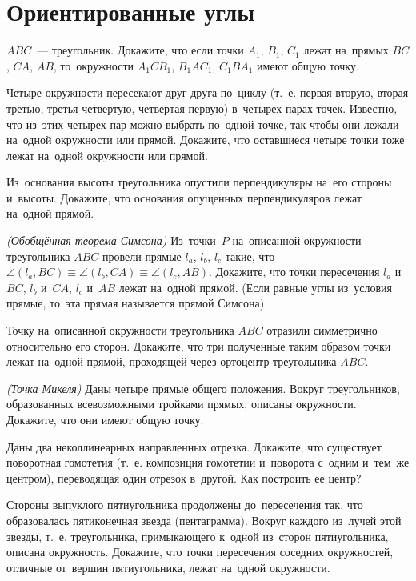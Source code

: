 
\section*{Ориентированные углы}


\begin{problems}

\item
$ABC$~--- треугольник.
Докажите, что если точки $A_1$, $B_1$, $C_1$ лежат на~прямых $BC$, $CA$, $AB$,
то~окружности $A_1 C B_1$, $B_1 A C_1$, $C_1 B A_1$ имеют общую точку.

\item
Четыре окружности пересекают друг друга по~циклу (т.~е. первая вторую, вторая
третью, третья четвертую, четвертая первую) в~четырех парах точек.
Известно, что из~этих четырех пар можно выбрать по~одной точке, так чтобы они
лежали на~одной окружности или прямой.
Докажите, что оставшиеся четыре точки тоже лежат на~одной окружности или
прямой.

\item
Из~основания высоты треугольника опустили перпендикуляры на~его стороны
и~высоты.
Докажите, что основания опущенных перпендикуляров лежат на~одной прямой.

\item\emph{(Обобщённая теорема Симсона)}
Из~точки~$P$ на~описанной окружности треугольника $ABC$ провели
прямые $l_a$, $l_b$, $l_c$ такие, что
$\angle (l_a, BC) \equiv \angle (l_b, CA) \equiv \angle (l_c, AB)$.
Докажите, что точки пересечения $l_a$ и~$BC$, $l_b$ и~$CA$, $l_c$ и~$AB$ лежат
на~одной прямой.
(Если равные углы из~условия прямые, то~эта прямая называется прямой Симсона)

\item
Точку на~описанной окружности треугольника $ABC$ отразили симметрично
относительно его сторон.
Докажите, что три полученные таким образом точки лежат на~одной прямой,
проходящей через ортоцентр треугольника $ABC$.

\item\emph{(Точка Микеля)}
Даны четыре прямые общего положения.
Вокруг треугольников, образованных всевозможными тройками прямых, описаны
окружности.
Докажите, что они имеют общую точку.

\item
Даны два неколлинеарных направленных отрезка.
Докажите, что существует поворотная гомотетия (т.~е. композиция гомотетии
и~поворота с~одним и~тем~же центром), переводящая один отрезок в~другой.
Как построить ее центр?

\item
Стороны выпуклого пятиугольника продолжены до~пересечения так, что образовалась
пятиконечная звезда (пентаграмма).
Вокруг каждого из~лучей этой звезды, т.~е. треугольника, примыкающего к~одной
из~сторон пятиугольника, описана окружность.
Докажите, что точки пересечения соседних окружностей, отличные от~вершин
пятиугольника, лежат на~одной окружности.

\end{problems}

